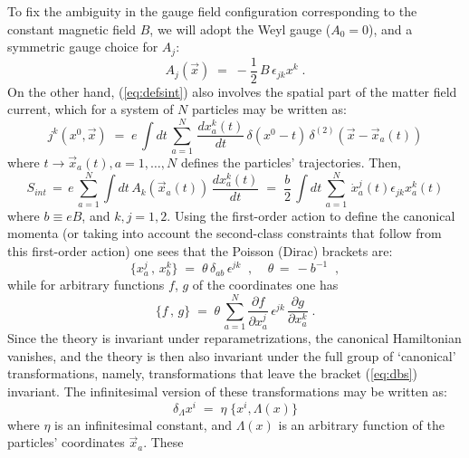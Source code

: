 \documentclass[a4paper,12pt]{article}
\begin{document}
To fix the ambiguity in the gauge field configuration corresponding
to
the constant magnetic field $B$, we will adopt the Weyl gauge
($A_0=0$), and a symmetric gauge choice for $A_j$:
\begin{equation}
  \label{eq:symmg}
  A_j({\vec x}) \;=\; - \frac{1}{2} \,B\,\epsilon_{jk} x^k \;.
\end{equation}
On the other hand, (\ref{eq:defsint}) also involves the spatial
part
of the matter field current, which for a system of $N$ particles
may
be written as:
\begin{equation}
  \label{eq:defcur}
  j^k(x^0,{\vec x}) \;=\; e\, \int dt \, \sum_{a=1}^N \,
\frac{dx^k_a(t)}{dt} \,
\delta(x^0-t)\, \delta^{(2)}({\vec x}-{\vec x}_a (t))   
\end{equation}
where $t \to {\vec x}_a (t), a=1,\ldots,N$ defines the particles'
trajectories.  Then,
\begin{equation}
  \label{eq:sint1}
S_{int} \,=\, e\, \sum_{a=1}^N \int dt \,A_k({\vec x}_a (t))\,
\frac{dx^k_a(t)}{dt} 
\;=\; \frac{b}{2} \, \int dt \, \sum_{a=1}^N \, {\dot x}^j_a(t)
\epsilon_{jk} x^k_a (t) 
\end{equation}
where $b \equiv e B$, and $k,j=1,2$. Using the first-order action
to define
the canonical momenta (or taking into account the second-class
constraints that follow from this first-order action) one sees that
the Poisson (Dirac) brackets are:
\begin{equation}
  \label{eq:dbs}
\{ x^j_a \,,\, x^k_b \}\;=\; \theta \, \delta_{ab} \, \epsilon^{jk}
\;\;,\;\;\;\; 
\theta \,=\, - b^{-1}\;\;,
\end{equation}
while for arbitrary functions $f$, $g$ of the coordinates one has
\begin{equation}
  \label{eq:dbsg}
\{f \,,\, g\}\;=\; \theta \, \sum_{a=1}^N  
\frac{\partial f}{\partial x^j_a}\, \epsilon^{jk} \, \frac{\partial
g}{\partial x^k_a}\;. 
\end{equation}
Since the theory is invariant under reparametrizations, the
canonical
Hamiltonian vanishes, and the theory is then also invariant under
the
full group of `canonical' transformations, namely, transformations
that leave the bracket (\ref{eq:dbs}) invariant. The infinitesimal
version of these transformations may be written as:
\begin{equation}
  \label{eq:cltrns}
\delta_\Lambda x^i \;=\; \eta \; \{ x^i , \Lambda(x)\}
\end{equation}
where $\eta$ is an infinitesimal constant, and $\Lambda(x)$ is an
arbitrary
function of the particles' coordinates ${\vec x}_a$.  These
\end{document}
